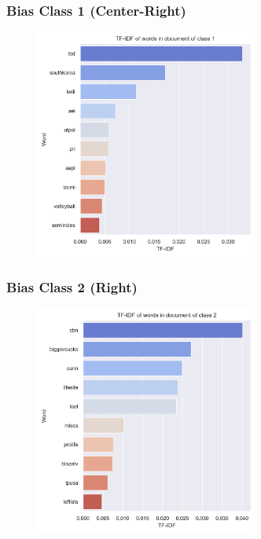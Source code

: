 \documentclass[11pt]{article}
\begin{document}
\pagebreak

\subsubsection{Bias Class 1 (Center-Right)}
\begin{center}


\TTTFIDFTable
\begin{figure}[h!]
  \includegraphics[width=0.65\textwidth]{figs/top_ten_tf_idf/tf_idf_word_1.png}
\end{figure}
\end{center}

\pagebreak

\subsubsection{Bias Class 2 (Right)}
\begin{center}


\TTTFIDFTable
\begin{figure}[h!]
  \includegraphics[width=0.65\textwidth]{figs/top_ten_tf_idf/tf_idf_word_2.png}
\end{figure}
\end{center}
\end{document}
